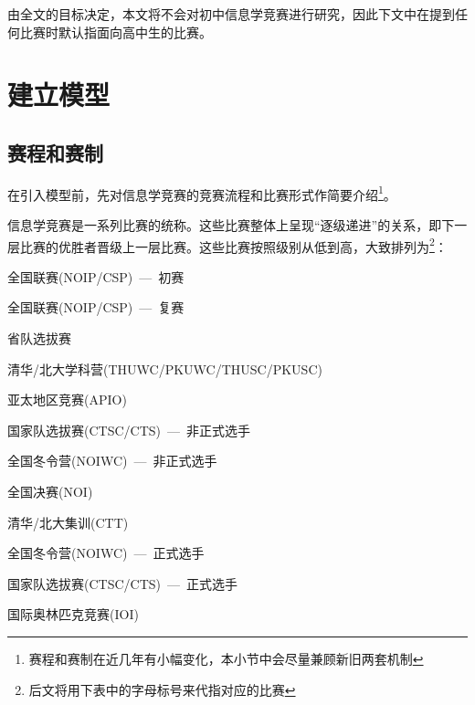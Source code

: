     由全文的目标决定，本文将不会对初中信息学竞赛进行研究，因此下文中在提到任何比赛时默认指面向高中生的比赛。

\section{建立模型}

    \subsection{赛程和赛制}

        在引入模型前，先对信息学竞赛的竞赛流程和比赛形式作简要介绍\footnote{赛程和赛制在近几年有小幅变化，本小节中会尽量兼顾新旧两套机制}。

        信息学竞赛是一系列比赛的统称。这些比赛整体上呈现“逐级递进”的关系，即下一层比赛的优胜者晋级上一层比赛。这些比赛按照级别从低到高，大致排列为\footnote{后文将用下表中的字母标号来代指对应的比赛}：

        \begin{asparaenum}[a.]
            \begin{samepage}
            \item 全国联赛(NOIP/CSP)\ ---\ 初赛
            \nobreak
            \item 全国联赛(NOIP/CSP)\ ---\ 复赛
            \nobreak
            \item 省队选拔赛
            \end{samepage}
            \item 清华/北大学科营(THUWC/PKUWC/THUSC/PKUSC)
            \item 亚太地区竞赛(APIO)
            \item 国家队选拔赛(CTSC/CTS)\ ---\ 非正式选手
            \item 全国冬令营(NOIWC)\ ---\ 非正式选手
            \item 全国决赛(NOI)
            \item 清华/北大集训(CTT)
            \begin{samepage}
            \item 全国冬令营(NOIWC)\ ---\ 正式选手
            \nobreak
            \item 国家队选拔赛(CTSC/CTS)\ ---\ 正式选手
            \nobreak
            \item 国际奥林匹克竞赛(IOI)
            \end{samepage}
        \end{asparaenum}

